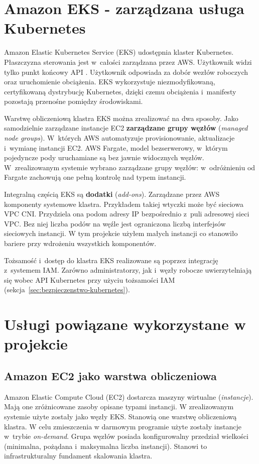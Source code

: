 \section{Amazon EKS - zarządzana usługa Kubernetes}
\label{sec:amazon-eks}

Amazon Elastic Kubernetes Service (EKS) udostępnia klaster Kubernetes. Płaszczyzna sterowania jest w~całości
zarządzana przez AWS. Użytkownik widzi tylko punkt końcowy API \parencite{awsdocs}. Użytkownik odpowiada
za dobór wezłów roboczych oraz uruchomienie obciążenia. EKS wykorzystuje niezmodyfikowaną, certyfikowaną 
dystrybucję Kubernetes, dzięki czemu obciążenia i~manifesty pozostają przenośne pomiędzy środowiskami.

Warstwę obliczeniową klastra EKS można zrealizować na dwa sposoby. Jako samodzielnie zarządzane instancje EC2
\textbf{zarządzane grupy węzłów} (\emph{managed node groups}). W~których AWS automatyzuje provisionowanie,
aktualizacje i~wymianę instancji EC2. AWS Fargate, model bezserwerowy, w~którym pojedyncze pody
uruchamiane są bez jawnie widocznych węzłów. W~zrealizowanym systemie wybrano zarządzane grupy węzłów: w~odróżnieniu
od Fargate zachowują one pełną kontrolę nad typem instancji.

Integralną częścią EKS są \textbf{dodatki} (\emph{add-ons}). Zarządzane przez AWS komponenty systemowe klastra.
Przykładem takiej wtyczki może być sieciowa VPC CNI. Przydziela ona podom adresy IP bezpośrednio z~puli
adresowej sieci VPC. Bez niej liczba podów na węźle jest ograniczona liczbą interfejsów sieciowych instancji.
W tym projekcie użyłem małych instancji co stanowiło bariere przy wdrożeniu wszystkich komponentów.

Tożsamość i~dostęp do klastra EKS realizowane są poprzez integrację z~systemem IAM. Zarówno administratorzy, jak
i~węzły robocze uwierzytelniają się wobec API Kubernetes przy użyciu tożsamości IAM (sekcja~\ref{sec:bezpieczenstwo-kubernetes}).

\section{Usługi powiązane wykorzystane w projekcie}
\label{sec:uslugi-powiazane}

\subsection{Amazon EC2 jako warstwa obliczeniowa}
\label{subsec:ec2}

Amazon Elastic Compute Cloud (EC2) dostarcza maszyny wirtualne (\emph{instancje}). Mają one zróżnicowane zasoby
opisane typami instancji. W zrealizowanym systemie użyte zostały jako węzły EKS. Stanowią one warstwę obliczeniową klastra.
W celu zmieszczenia w darmowym programie użyte zostały instancje  w~trybie \emph{on-demand}.
Grupa węzłów posiada konfigurowalny przedział wielkości (minimalna, pożądana i~maksymalna liczba instancji). 
Stanowi to infrastrukturalny fundament skalowania klastra.

